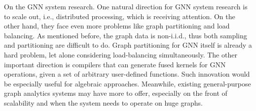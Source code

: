 On the GNN system research. One natural direction for GNN system research is to scale out, i.e., distributed processing, which is receiving attention. On the other hand, they face even more problems like graph partitioning and load balancing. As mentioned before, the graph data is non-i.i.d., thus both sampling and partitioning are difficult to do. Graph partitioning for GNN itself is already a hard problem, let alone considering load-balancing simultaneously. The other important direction is compilers that can generate fused kernels for GNN operations, given a set of arbitrary user-defined functions. Such innovation would be especially useful for algebraic approaches. Meanwhile, existing general-purpose graph analytics systems may have more to offer, especially on the front of scalability and when the system needs to operate on huge graphs.

